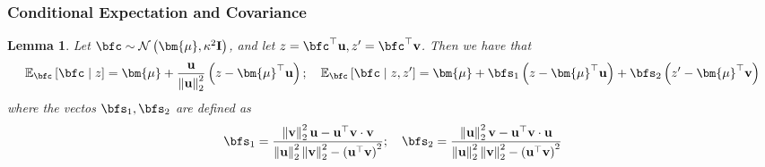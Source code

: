\documentclass[10pt]{article} %
\newtheorem{lemma}[theorem]{Lemma}
\theoremstyle{definition}
\theoremstyle{plain}
\newcommand{\paren}[1]{\left(#1\right)}
\newcommand{\norm}[1]{\left\|#1\right\|}
\providecommand{\E}{\mathbb{E}}
\def\bfI{{\mathbf{I}}}\def\bfJ{{\mathbf{J}}}\def\bfK{{\mathbf{K}}}\def\bfL{{\mathbf{L}}}
\def\bfu{{\mathbf{u}}}\def\bfv{{\mathbf{v}}}\def\bfw{{\mathbf{w}}}\def\bfx{{\mathbf{x}}}
\begin{document}
\subsubsection{Conditional Expectation and Covariance}
\begin{lemma}
    \label{lem:conditional_exp}
    Let $\bfc\sim\mathcal{N}\paren{\bm{\mu},\kappa^2\bfI}$, and let $z = \bfc^\top\bfu, z' = \bfc^\top\bfv$. Then we have that
    \[
        \E_{\bfc}\left[\bfc\mid z\right] = \bm{\mu} + \frac{\bfu}{\norm{\bfu}_2^2}\paren{z - \bm{\mu}^\top\bfu}; \quad\E_{\bfc}\left[\bfc\mid z, z'\right] = \bm{\mu} + \bfs_1\paren{z - \bm{\mu}^\top\bfu} + \bfs_2\paren{z' - \bm{\mu}^\top\bfv}
    \]
    where the vectos $\bfs_1,\bfs_2$ are defined as
    \[
        \bfs_1 = \frac{\norm{\bfv}_2^2\bfu - \bfu^\top\bfv\cdot\bfv}{\norm{\bfu}_2^2\norm{\bfv}_2^2 - \paren{\bfu^\top\bfv}^2};\quad \bfs_2 = \frac{\norm{\bfu}_2^2\bfv - \bfu^\top\bfv\cdot\bfu}{\norm{\bfu}_2^2\norm{\bfv}_2^2 - \paren{\bfu^\top\bfv}^2}
    \]
\end{lemma}
\end{document}
